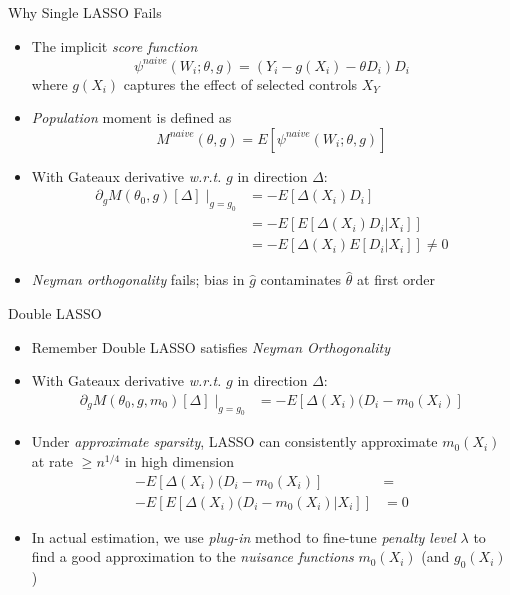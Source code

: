 \documentclass[aspectratio=1610,12pt,xcolor=dvipsnames]{beamer}
\begin{document}
\begin{frame}{Why Single LASSO Fails}
\begin{itemize}
    \item The implicit \textit{score function} 
    \[
    \psi^{naive}(W_i;\theta,g) = (Y_i - g(X_i) - \theta D_i)D_i
    \]
    where $g(X_i)$ captures the effect of selected controls $X_Y$
    \item \textit{Population} moment is defined as
    \[
    M^{naive}(\theta,g) = E[\psi^{naive}(W_i;\theta,g)]
    \]
    \item With Gateaux derivative \textit{w.r.t.} $g$ in direction $\Delta$:
    \begin{align*}
    \partial_g M(\theta_0,g)[\Delta]\;\Big|_{g=g_0}
  &= -E[\Delta(X_i)D_i] \\ 
  &= -E[E[\Delta(X_i)D_i|X_i]] \\
  &= -E[\Delta(X_i) E[D_i|X_i]] \neq 0
    \end{align*}
    \item \textit{Neyman orthogonality} fails; bias in $\hat g$ contaminates $\hat \theta$ at first order
\end{itemize}
\end{frame}

\begin{frame}{Double LASSO}

\begin{itemize}
    \item Remember Double LASSO satisfies \textit{Neyman Orthogonality}
    \item With Gateaux derivative \textit{w.r.t.} $g$ in direction $\Delta$:
    \begin{align*}
    \partial_g M(\theta_0,g,m_0)[\Delta]\;\Big|_{g=g_0}
  &= -E[\Delta(X_i)(D_i - m_0(X_i)]
    \end{align*}
    \item Under \textit{approximate sparsity}, LASSO can consistently approximate $m_0(X_i)$ at rate $\geq n^{1/4}$ in high dimension
    \begin{align*}
        -E[\Delta(X_i)(D_i - m_0(X_i)] &= \\
        -E[E[\Delta(X_i)(D_i - m_0(X_i)|X_i]] &= 0
    \end{align*}
    \item In actual estimation, we use \textit{plug-in} method to fine-tune \textit{penalty level} $\lambda$ to find a good approximation to the \textit{nuisance functions} $m_0(X_i)$ (and $g_0(X_i)$)
\end{itemize}
\end{frame}
\end{document}
